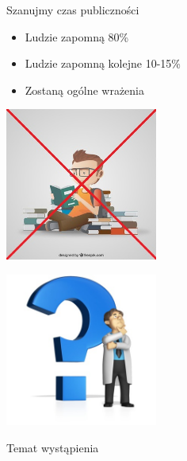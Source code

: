 \documentclass{beamer}
\begin{document}
\begin{frame}{}
	\begin{center}
		\Huge{Szanujmy czas publiczności}
	\end{center}
\end{frame}

\begin{frame}{}
	\begin{Large}
		\begin{itemize}
			\item Ludzie zapomną 80\%
			\item Ludzie zapomną kolejne 10-15\%
			\item Zostaną ogólne wrażenia
		\end{itemize}
	\end{Large}
\end{frame}

\begin{frame}{}
	\begin{center}
  		\includegraphics[height=5cm]{nauka.jpg}
	\end{center}
\end{frame}

\begin{frame}{}
	\begin{center}
  		\includegraphics[height=5cm]{refleksja2.jpg}
	\end{center}
\end{frame}

\begin{frame}{}
	\begin{center}
		\Huge{Temat wystąpienia}
	\end{center}
\end{frame}
\end{document}
